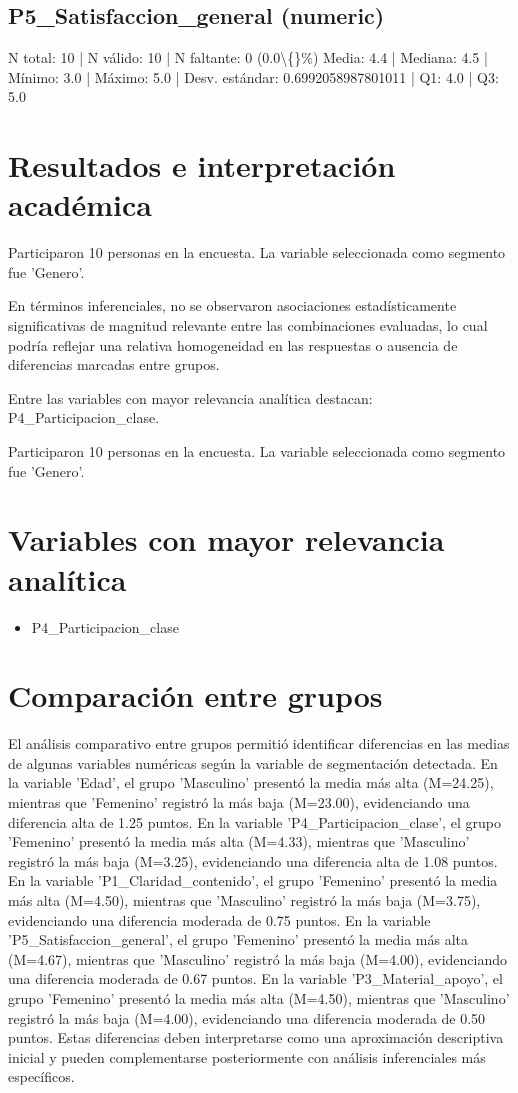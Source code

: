 \documentclass[12pt,a4paper]{article}
\begin{document}
\subsection{P5\_Satisfaccion\_general (numeric)}
N total: 10 | N válido: 10 | N faltante: 0 (0.0\textbackslash\{\}\%)
Media: 4.4 | Mediana: 4.5 | Mínimo: 3.0 | Máximo: 5.0 | Desv. estándar: 0.6992058987801011 | Q1: 4.0 | Q3: 5.0
\section{Resultados e interpretación académica}
Participaron 10 personas en la encuesta.
La variable seleccionada como segmento fue 'Genero'.

En términos inferenciales, no se observaron asociaciones estadísticamente significativas de magnitud relevante entre las combinaciones evaluadas, lo cual podría reflejar una relativa homogeneidad en las respuestas o ausencia de diferencias marcadas entre grupos.

Entre las variables con mayor relevancia analítica destacan: P4\_Participacion\_clase.

Participaron 10 personas en la encuesta.
La variable seleccionada como segmento fue 'Genero'.
\section{Variables con mayor relevancia analítica}
\begin{itemize}
\item P4\_Participacion\_clase
\end{itemize}
\section{Comparación entre grupos}
El análisis comparativo entre grupos permitió identificar diferencias en las medias de algunas variables numéricas según la variable de segmentación detectada. En la variable 'Edad', el grupo 'Masculino' presentó la media más alta (M=24.25), mientras que 'Femenino' registró la más baja (M=23.00), evidenciando una diferencia alta de 1.25 puntos. En la variable 'P4\_Participacion\_clase', el grupo 'Femenino' presentó la media más alta (M=4.33), mientras que 'Masculino' registró la más baja (M=3.25), evidenciando una diferencia alta de 1.08 puntos. En la variable 'P1\_Claridad\_contenido', el grupo 'Femenino' presentó la media más alta (M=4.50), mientras que 'Masculino' registró la más baja (M=3.75), evidenciando una diferencia moderada de 0.75 puntos. En la variable 'P5\_Satisfaccion\_general', el grupo 'Femenino' presentó la media más alta (M=4.67), mientras que 'Masculino' registró la más baja (M=4.00), evidenciando una diferencia moderada de 0.67 puntos. En la variable 'P3\_Material\_apoyo', el grupo 'Femenino' presentó la media más alta (M=4.50), mientras que 'Masculino' registró la más baja (M=4.00), evidenciando una diferencia moderada de 0.50 puntos. Estas diferencias deben interpretarse como una aproximación descriptiva inicial y pueden complementarse posteriormente con análisis inferenciales más específicos.
\end{document}
